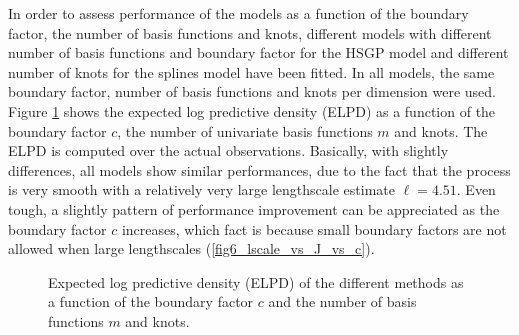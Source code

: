 \documentclass[]{interact}
\theoremstyle{plain}%
\theoremstyle{definition}
\theoremstyle{remark}
\begin{document}
In order to assess performance of the models as a function of the boundary factor, the number of basis functions and knots, different models with different number of basis functions and boundary factor for the HSGP model and different number of knots for the splines model have been fitted. In all models, the same boundary factor, number of basis functions and knots per dimension were used. Figure \ref{fig19_ELPD_diabetes} shows the expected log predictive density (ELPD) as a function of the boundary factor $c$, the number of univariate basis functions $m$ and knots. The ELPD is computed over the actual observations. Basically, with slightly differences, all models show similar performances, due to the fact that the process is very smooth with a relatively very large lengthscale estimate $\ell=4.51$. Even tough, a slightly pattern of performance improvement can be appreciated as the boundary factor $c$ increases, which fact is because small boundary factors are not allowed when large lengthscales (\ref{fig6_lscale_vs_J_vs_c}).
%
\begin{figure}
\centering
{}
\caption{Expected log predictive density (ELPD) of the different methods as a function of the boundary factor $c$ and the number of basis functions $m$ and knots.}
  \label{fig19_ELPD_diabetes}
\end{figure}
\end{document}

